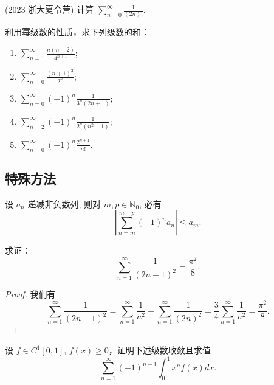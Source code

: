 \documentclass[lang=cn,10pt,thmcnt=section]{elegantbook}
\begin{document}
	\begin{example}
	(2023 浙大夏令营) 计算 $\sum_{n=0}^{\infty} \frac{1}{(2n)!}$.
	\end{example}

	\begin{example}
		利用幂级数的性质，求下列级数的和：
		\begin{enumerate}
			\item $\sum_{n=1}^{\infty} \frac{n(n+2)}{4^{n+1}}$;
			\item $\sum_{n=0}^{\infty} \frac{(n+1)^2}{2^n}$;
			\item $\sum_{n=0}^{\infty} (-1)^n \frac{1}{3^n (2n+1)}$;
			\item $\sum_{n=2}^{\infty} (-1)^n \frac{1}{2^n (n^2 - 1)}$;
			\item $\sum_{n=0}^{\infty} (-1)^n \frac{2^{n+1}}{n!}$.
		\end{enumerate}
	\end{example}
\subsection{特殊方法}
\begin{theorem}[交错级数不等式]
	设 $a_n$ 递减非负数列, 则对 $m, p \in \mathbb{N}_0$, 必有
\[
\left| \sum_{n=m}^{m+p} (-1)^n a_n \right| \le a_m.
\]
\end{theorem}
\begin{example}
	求证：
\[
\sum_{n=1}^{\infty} \frac{1}{(2n-1)^2} = \frac{\pi^2}{8}.
\]
\end{example}
\begin{proof}
	我们有
\[
\sum_{n=1}^\infty \frac{1}{(2n-1)^2} = \sum_{n=1}^\infty \frac{1}{n^2} - \sum_{n=1}^\infty \frac{1}{(2n)^2} = \frac{3}{4} \sum_{n=1}^\infty \frac{1}{n^2} = \frac{\pi^2}{8}.
\]
\end{proof}
\begin{example}
	设 $f \in C^1[0,1]$, $f(x) \geq 0$，证明下述级数收敛且求值
\[
\sum_{n=1}^{\infty} (-1)^{n-1} \int_0^1 x^n f(x) dx.
\]
\end{example}
\end{document}
